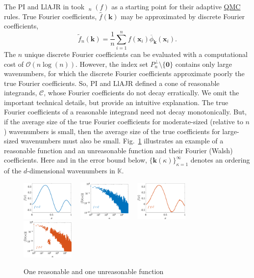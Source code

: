 \documentclass[11pt]{NSFamsart}
\newcommand{\QMC}{\hyperlink{QMClink}{QMC}\xspace}
\newcommand{\hf}{\widehat{f}}
\newcommand{\tf}{\widetilde{f}}
\newcommand{\bbK}{\mathbb{K}}
\DeclareMathOperator{\err}{err}
\DeclareMathOperator{\oerr}{\overline{\err}}
\newcommand{\bzero}{\boldsymbol{0}}
\newcommand{\bx}{{\boldsymbol{x}}}
\newcommand{\bk}{{\boldsymbol{k}}}
\newcommand{\cc}{\mathcal{C}}
\newcommand{\Order}{\mathcal{O}}
\begin{document}
The PI and LlAJR in \cite{HicJim16a,JimHic16a} took $\oerr_n(f)$ as a starting point for their 
adaptive \QMC rules.   True Fourier 
coefficients, $\hf(\bk)$ may be approximated 
by discrete Fourier coefficients,
\begin{equation*}
\tf_n(\bk)  = \frac{1}n \sum_{i=1}^{n} f(\bx_i) \overline{\phi}_{\bk}(\bx_i).
\end{equation*}
The $n$ unique discrete Fourier coefficients can be evaluated with a computational cost of 
$\Order(n \log(n))$.  However, the index set $P^\perp_n \setminus\{\bzero\}$ contains only large 
wavenumbers, for which the discrete Fourier coefficients approximate poorly the true Fourier 
coefficients.  So, PI and LlAJR defined a cone of reasonable integrands, $\cc$, 
whose Fourier coefficients do not decay erratically.  We omit the important technical details, but 
provide an intuitive explanation.  The true Fourier coefficients of a reasonable integrand
need not decay monotonically.  But, if the average size of the true Fourier coefficients for 
moderate-sized (relative to $n$) wavenumbers is small, then the average size of the true 
coefficients for large-sized wavenumbers must also be small.  Fig.\ \ref{GoodBadWalshFig} 
illustrates an example of a reasonable function and an unreasonable function and their Fourier 
(Walsh) coefficients.  Here and in the error bound below, $\{\bk(\kappa)\}_{\kappa = 1}^\infty$ 
denotes an ordering of 
the $d$-dimensional wavenumbers in $\bbK$.

\begin{figure}[h]
	\centering
	\includegraphics[width = 0.23\textwidth] 
	{ProgramsImages/FunctionWalshFourierCoeffDecay.eps} \ \ 
	\includegraphics[width = 0.23\textwidth] 
	{ProgramsImages/WalshFourierCoeffDecay128.eps} \ \ 
	\includegraphics[width = 0.23\textwidth] 
	{ProgramsImages/FilteredFunctionWalshFourierCoeffDecay.eps} \ \ 
	\includegraphics[width = 0.23\textwidth] 
	{ProgramsImages/WalshFourierCoeffDecayFilter.eps}
	\caption{One reasonable and one unreasonable function 
	\label{GoodBadWalshFig}}
\end{figure}
\end{document}
